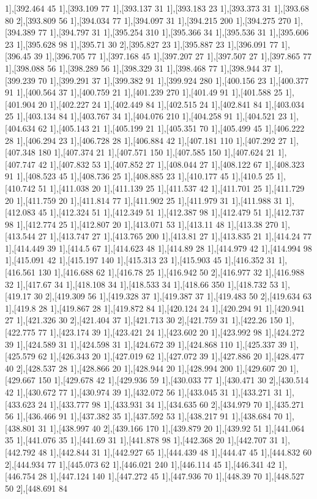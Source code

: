 {1],[392.464 45 1],[393.109 77 1],[393.137 31 1],[393.183 23 1],[393.373 31 1],[393.68 80 2],[393.809 56 1],[394.034 77 1],[394.097 31 1],[394.215 200 1],[394.275 270 1],[394.389 77 1],[394.797 31 1],[395.254 310 1],[395.366 34 1],[395.536 31 1],[395.606 23 1],[395.628 98 1],[395.71 30 2],[395.827 23 1],[395.887 23 1],[396.091 77 1],[396.45 39 1],[396.705 77 1],[397.168 45 1],[397.207 27 1],[397.507 27 1],[397.865 77 1],[398.088 56 1],[398.289 56 1],[398.329 31 1],[398.468 77 1],[398.944 37 1],[399.239 70 1],[399.291 37 1],[399.382 91 1],[399.924 280 1],[400.156 23 1],[400.377 91 1],[400.564 37 1],[400.759 21 1],[401.239 270 1],[401.49 91 1],[401.588 25 1],[401.904 20 1],[402.227 24 1],[402.449 84 1],[402.515 24 1],[402.841 84 1],[403.034 25 1],[403.134 84 1],[403.767 34 1],[404.076 210 1],[404.258 91 1],[404.521 23 1],[404.634 62 1],[405.143 21 1],[405.199 21 1],[405.351 70 1],[405.499 45 1],[406.222 28 1],[406.294 23 1],[406.728 28 1],[406.884 42 1],[407.181 110 1],[407.292 27 1],[407.348 180 1],[407.374 21 1],[407.571 150 1],[407.585 150 1],[407.624 21 1],[407.747 42 1],[407.832 53 1],[407.852 27 1],[408.044 27 1],[408.122 67 1],[408.323 91 1],[408.523 45 1],[408.736 25 1],[408.885 23 1],[410.177 45 1],[410.5 25 1],[410.742 51 1],[411.038 20 1],[411.139 25 1],[411.537 42 1],[411.701 25 1],[411.729 20 1],[411.759 20 1],[411.814 77 1],[411.902 25 1],[411.979 31 1],[411.988 31 1],[412.083 45 1],[412.324 51 1],[412.349 51 1],[412.387 98 1],[412.479 51 1],[412.737 98 1],[412.774 25 1],[412.807 20 1],[413.071 53 1],[413.11 48 1],[413.38 270 1],[413.544 27 1],[413.747 27 1],[413.765 200 1],[413.81 27 1],[413.835 21 1],[414.24 77 1],[414.449 39 1],[414.5 67 1],[414.623 48 1],[414.89 28 1],[414.979 42 1],[414.994 98 1],[415.091 42 1],[415.197 140 1],[415.313 23 1],[415.903 45 1],[416.352 31 1],[416.561 130 1],[416.688 62 1],[416.78 25 1],[416.942 50 2],[416.977 32 1],[416.988 32 1],[417.67 34 1],[418.108 34 1],[418.533 34 1],[418.66 350 1],[418.732 53 1],[419.17 30 2],[419.309 56 1],[419.328 37 1],[419.387 37 1],[419.483 50 2],[419.634 63 1],[419.8 28 1],[419.867 28 1],[419.872 84 1],[420.124 24 1],[420.294 91 1],[420.941 27 1],[421.326 30 2],[421.404 37 1],[421.713 30 2],[421.759 31 1],[422.26 150 1],[422.775 77 1],[423.174 39 1],[423.421 24 1],[423.602 20 1],[423.992 98 1],[424.272 39 1],[424.589 31 1],[424.598 31 1],[424.672 39 1],[424.868 110 1],[425.337 39 1],[425.579 62 1],[426.343 20 1],[427.019 62 1],[427.072 39 1],[427.886 20 1],[428.477 40 2],[428.537 28 1],[428.866 20 1],[428.944 20 1],[428.994 200 1],[429.607 20 1],[429.667 150 1],[429.678 42 1],[429.936 59 1],[430.033 77 1],[430.471 30 2],[430.514 42 1],[430.672 77 1],[430.974 39 1],[432.072 56 1],[433.045 31 1],[433.271 31 1],[433.623 24 1],[433.777 98 1],[433.931 34 1],[434.635 60 2],[434.979 70 1],[435.271 56 1],[436.466 91 1],[437.382 35 1],[437.592 53 1],[438.217 91 1],[438.684 70 1],[438.801 31 1],[438.997 40 2],[439.166 170 1],[439.879 20 1],[439.92 51 1],[441.064 35 1],[441.076 35 1],[441.69 31 1],[441.878 98 1],[442.368 20 1],[442.707 31 1],[442.792 48 1],[442.844 31 1],[442.927 65 1],[444.439 48 1],[444.47 45 1],[444.832 60 2],[444.934 77 1],[445.073 62 1],[446.021 240 1],[446.114 45 1],[446.341 42 1],[446.754 28 1],[447.124 140 1],[447.272 45 1],[447.936 70 1],[448.39 70 1],[448.527 50 2],[448.691 84 }
